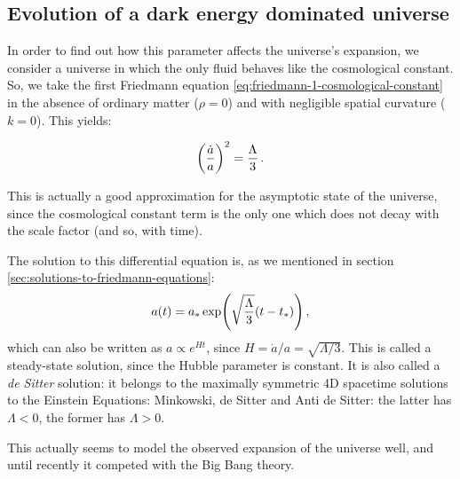 \documentclass[main.tex]{subfiles}
\begin{document}

\subsection{Evolution of a dark energy dominated universe}

In order to find out how this parameter affects the universe's expansion, we consider a universe in which the only fluid behaves like the cosmological constant. 
So, we take the first Friedmann equation \eqref{eq:friedmann-1-cosmological-constant} in the absence of ordinary matter (\(\rho = 0\)) and with negligible spatial curvature (\(k= 0\)). This yields:

\begin{equation}
  \qty(\frac{\dot{a} }{a})^2 = \frac{\Lambda}{3}
\,.
\end{equation}

This is actually a good approximation for the asymptotic state of the universe, since the cosmological constant term is the only one which does not decay with the scale factor (and so, with time).

The solution to this differential equation is, as we mentioned in section \ref{sec:solutions-to-friedmann-equations}:
%
\begin{equation}
  a(t) = a_{*} \exp(\sqrt{\frac{\Lambda}{3}} \qty(t-t_{*})) 
\,,
\end{equation}
%
which can also be written as \(a \propto e^{Ht}\), since \(H = \dot{a} / a = \sqrt{\Lambda / 3}\).
This is called a steady-state solution, since the Hubble parameter is constant. 
It is also called a \emph{de Sitter} solution: it belongs to the maximally symmetric 4D spacetime solutions to the Einstein Equations: Minkowski, de Sitter and Anti de Sitter: the latter has \(\Lambda < 0\), the former has \(\Lambda >0\).

This actually seems to model the observed expansion of the universe well, and until recently it competed with the Big Bang theory. 
\end{document}
